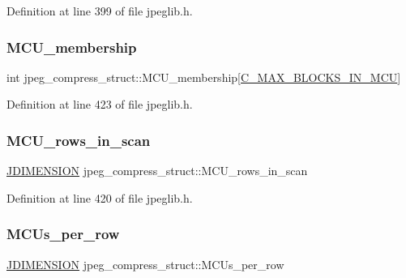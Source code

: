 Definition at line 399 of file jpeglib.\+h.

\mbox{\label{structjpeg__compress__struct_a6debf977451892aae1116b47c5c1c95f}} 
\subsubsection{\texorpdfstring{MCU\_membership}{MCU\_membership}}
{\footnotesize\ttfamily int jpeg\+\_\+compress\+\_\+struct\+::\+M\+C\+U\+\_\+membership\mbox{[}\mbox{\hyperlink{jpeglib_8h_a4f270f4efb3fc0bb09f0d5ffa51ca327}{C\+\_\+\+M\+A\+X\+\_\+\+B\+L\+O\+C\+K\+S\+\_\+\+I\+N\+\_\+\+M\+CU}}\mbox{]}}



Definition at line 423 of file jpeglib.\+h.

\mbox{\label{structjpeg__compress__struct_ab605396740a26114095bf99c7c7349fb}} 
\subsubsection{\texorpdfstring{MCU\_rows\_in\_scan}{MCU\_rows\_in\_scan}}
{\footnotesize\ttfamily \mbox{\hyperlink{jmorecfg_8h_a04ed4674f6f1d0d50ec241531e38274f}{J\+D\+I\+M\+E\+N\+S\+I\+ON}} jpeg\+\_\+compress\+\_\+struct\+::\+M\+C\+U\+\_\+rows\+\_\+in\+\_\+scan}



Definition at line 420 of file jpeglib.\+h.

\mbox{\label{structjpeg__compress__struct_a97f0c5e0ae932d1810007077443da684}} 
\subsubsection{\texorpdfstring{MCUs\_per\_row}{MCUs\_per\_row}}
{\footnotesize\ttfamily \mbox{\hyperlink{jmorecfg_8h_a04ed4674f6f1d0d50ec241531e38274f}{J\+D\+I\+M\+E\+N\+S\+I\+ON}} jpeg\+\_\+compress\+\_\+struct\+::\+M\+C\+Us\+\_\+per\+\_\+row}



